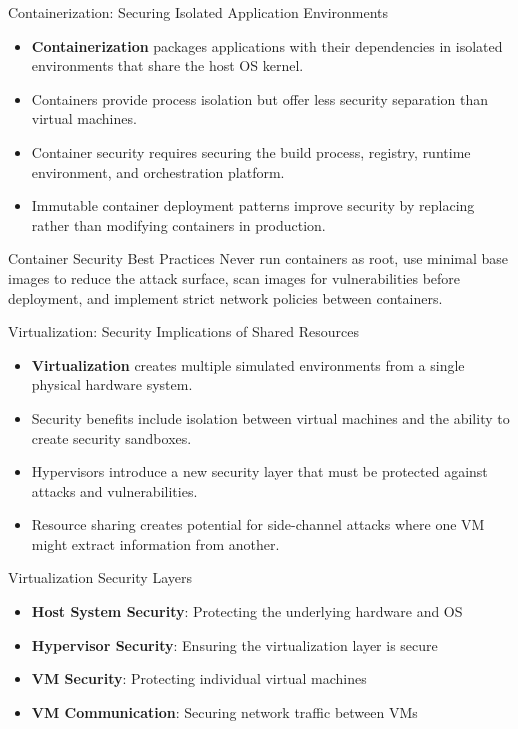 \documentclass{beamer}
\begin{document}
    \begin{frame}{Containerization: Securing Isolated Application Environments}
    \begin{itemize}
    \item \textbf{Containerization} packages applications with their dependencies in isolated environments that share the host OS kernel.
    \item Containers provide process isolation but offer less security separation than virtual machines.
    \item Container security requires securing the build process, registry, runtime environment, and orchestration platform.
    \item Immutable container deployment patterns improve security by replacing rather than modifying containers in production.
    \end{itemize}
    
    \begin{alertblock}{Container Security Best Practices}
    Never run containers as root, use minimal base images to reduce the attack surface, scan images for vulnerabilities before deployment, and implement strict network policies between containers.
    \end{alertblock}
    \end{frame}

\begin{frame}{Virtualization: Security Implications of Shared Resources}
\begin{itemize}
\item \textbf{Virtualization} creates multiple simulated environments from a single physical hardware system.
\item Security benefits include isolation between virtual machines and the ability to create security sandboxes.
\item Hypervisors introduce a new security layer that must be protected against attacks and vulnerabilities.
\item Resource sharing creates potential for side-channel attacks where one VM might extract information from another.
\end{itemize}

\begin{block}{Virtualization Security Layers}
\begin{itemize}
\item \textbf{Host System Security}: Protecting the underlying hardware and OS
\item \textbf{Hypervisor Security}: Ensuring the virtualization layer is secure
\item \textbf{VM Security}: Protecting individual virtual machines
\item \textbf{VM Communication}: Securing network traffic between VMs
\end{itemize}
\end{block}
\end{frame}
\end{document}
